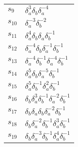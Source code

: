 \documentclass{article}
\begin{document}
\begin{center}
\begin{tabular}{ll}
$s_{9}$ & $\delta_a^{3}\delta_b^{}\delta_a^{-4}$ \\
$s_{10}$ & $\delta_a^{-3}\delta_b^{-2}$ \\
$s_{11}$ & $\delta_a^{4}\delta_b^{}\delta_a^{}\delta_b^{-1}$ \\
$s_{12}$ & $\delta_a^{-4}\delta_b^{}\delta_a^{-1}\delta_b^{-1}$ \\
$s_{13}$ & $\delta_a^{-4}\delta_b^{-1}\delta_a^{-4}\delta_b^{-1}$ \\
$s_{14}$ & $\delta_a^{5}\delta_b^{}\delta_a^{-5}\delta_b^{-1}$ \\
$s_{15}$ & $\delta_a^{5}\delta_b^{-1}\delta_a^{2}\delta_b^{-1}$ \\
$s_{16}$ & $\delta_b^{}\delta_a^{3}\delta_b^{-1}\delta_a^{-2}\delta_b^{-1}$ \\
$s_{17}$ & $\delta_b^{}\delta_a^{}\delta_b^{}\delta_a^{-2}\delta_b^{-1}$ \\
$s_{18}$ & $\delta_b^{}\delta_a^{-2}\delta_b^{-1}\delta_a^{3}\delta_b^{-1}$ \\
$s_{19}$ & $\delta_b^{}\delta_a^{-3}\delta_b^{-1}\delta_a^{4}\delta_b^{-1}$ \\
\bottomrule
\end{tabular}
\end{center}

\thispagestyle{empty}
\end{document}
